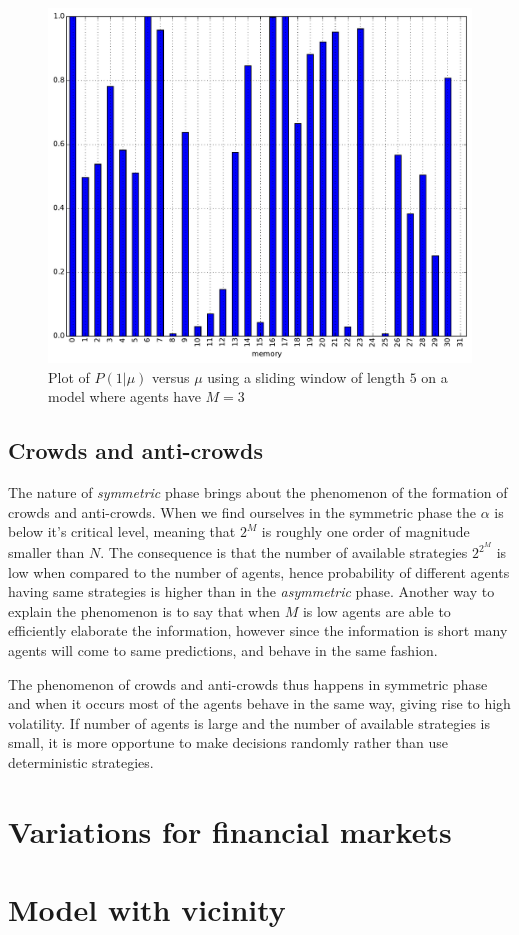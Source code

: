 \begin{figure}[h]
\begin{center}
\includegraphics[scale=0.4]{images/minority/information_probability_m3_a5.pdf}
\caption{Plot of $P(1|\mu)$ versus $\mu$ using a sliding window of length $5$ on a model where agents have $M=3$}
\label{fig:information_35}
\end{center}
\end{figure}

\subsection{Crowds and anti-crowds}
\label{subsec:crowds}

The nature of \textit{symmetric} phase brings about the phenomenon of the formation of crowds and anti-crowds.
When we find ourselves in the symmetric phase the $\alpha$ is below it's critical level, meaning that $2^M$ is roughly one order of magnitude smaller than $N$.
The consequence is that the number of available strategies $2^{2^M}$ is low when compared to the number of agents, hence probability of different agents having same strategies is higher than in the \textit{asymmetric} phase.
Another way to explain the phenomenon is to say that when $M$ is low agents are able to efficiently elaborate the information, however since the information is short many agents will come to same predictions, and behave in the same fashion.

The phenomenon of crowds and anti-crowds thus happens in symmetric phase and when it occurs most of the agents behave in the same way, giving rise to high volatility.
If number of agents is large and the number of available strategies is small, it is more opportune to make decisions randomly rather than use deterministic strategies.

\section{Variations for financial markets}
\label{minority:variations}

\section{Model with vicinity}
\label{minority:vicinity}
